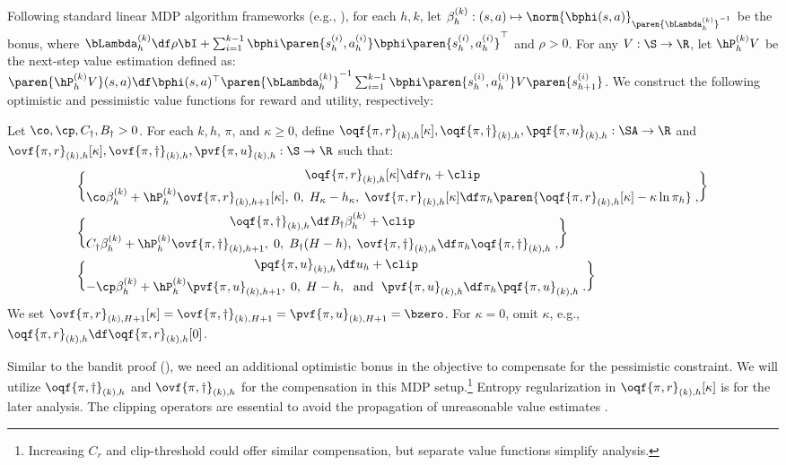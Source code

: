 Following standard linear MDP algorithm frameworks (e.g., \citet{jin2020provably,lykouris2021corruption}), for each $h, k$, let 
\(\beta^{(k)}_h: (s, a) \mapsto \norm{\bphi(s, a)}_{\paren{\bLambda^{(k)}_h}^{-1}}\) be the bonus, where \(\bLambda^{(k)}_h \df \rho \bI + \sum_{i=1}^{k-1} \bphi\paren{s_h^{(i)}, a_h^{(i)}} \bphi\paren{s_h^{(i)}, a_h^{(i)}}^\top\) and $\rho > 0$.
For any $V: \S \to \R$, let $\hP^{(k)}_h V$ be the next-step value estimation defined as:
$
\paren{\hP^{(k)}_h V}(s, a) \df \bphi(s, a)^{\top}\paren{\bLambda^{(k)}_h}^{-1} \sum_{i=1}^{k-1}\bphi\paren{s_h^{(i)}, a_h^{(i)}} V\paren{s_{h+1}^{(i)}}
$.
We construct the following optimistic and pessimistic value functions for reward and utility, respectively:
\begin{definition}\label{def:clipped value functions}
Let $\co, \cp, C_\dagger, B_\dagger > 0$.
For each $k, h$, $\pi$, and $\kappa \geq 0$, 
define \(\oqf{\pi, r}_{(k), h}[\kappa], \oqf{\pi, \dagger}_{(k), h}, \pqf{\pi, u}_{(k), h}: \SA\to \R\) 
and \(\ovf{\pi, r}_{(k), h}[\kappa], \ovf{\pi, \dagger}_{(k), h}, \pvf{\pi, u}_{(k), h}: \S \to \R\) such that:
\begin{align*}
&\oqf{\pi, r}_{(k), h}[\kappa] \df r_h + \clip\brace{\co \beta^{(k)}_h + \hP^{(k)}_h \ovf{\pi, r}_{(k), h+1}[\kappa], \; 0, \; H_\kappa-h_\kappa},\;
\ovf{\pi, r}_{(k), h}[\kappa] \df \pi_h\paren{\oqf{\pi, r}_{(k), h}[\kappa] - \kappa \ln \pi_h}\;,\\
&\oqf{\pi, \dagger}_{(k), h} \df B_\dagger \beta^{(k)}_h + \clip\brace{C_\dagger \beta^{(k)}_h + \hP^{(k)}_h \ovf{\pi, \dagger}_{(k), h+1}, \; 0, \; B_\dagger (H-h)},\;
\ovf{\pi, \dagger}_{(k), h} \df \pi_h\oqf{\pi, \dagger}_{(k), h}\;,\\
&\pqf{\pi, u}_{(k), h} \df u_h + \clip\brace{-\cp \beta^{(k)}_h + \hP^{(k)}_h \pvf{\pi, u}_{(k), h+1}, \; 0, \; H-h},\; \text{ and }\;
\pvf{\pi, u}_{(k), h} \df \pi_h\pqf{\pi, u}_{(k), h}\;.
\end{align*}
We set \(\ovf{\pi, r}_{(k), H+1}[\kappa] = \ovf{\pi, \dagger}_{(k), H+1} = \pvf{\pi, u}_{(k), H+1} = \bzero\).
For \(\kappa = 0\), omit \(\kappa\), e.g., \(\oqf{\pi, r}_{(k), h} \df \oqf{\pi, r}_{(k), h}[0]\).
\end{definition}
Similar to the bandit proof (), we need an additional optimistic bonus in the objective to compensate for the pessimistic constraint. 
We will utilize \(\oqf{\pi, \dagger}_{(k), h}\) and \(\ovf{\pi, \dagger}_{(k), h}\) for the compensation in this MDP setup.\footnote{Increasing $C_r$ and clip-threshold could offer similar compensation, but separate value functions simplify analysis.}
Entropy regularization in $\oqf{\pi, r}_{(k), h}[\kappa]$ is for the later analysis.
The clipping operators are essential to avoid the propagation of unreasonable value estimates \citep{zanette2020frequentist}.

